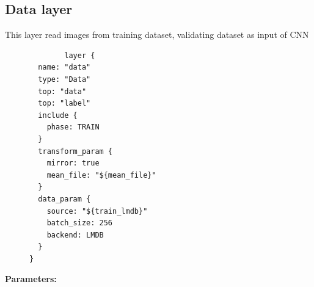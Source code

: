 \documentclass[11pt]{article}
\begin{document}
\subsection{Data layer}
This layer read images from training dataset, validating dataset as input of CNN
\begin{figure}
  \begin{center}
	\begin{verbatim}
		layer {
  name: "data"
  type: "Data"
  top: "data"
  top: "label"
  include {
    phase: TRAIN
  }
  transform_param {
    mirror: true
    mean_file: "${mean_file}"
  }
  data_param {
    source: "${train_lmdb}"
    batch_size: 256
    backend: LMDB
  }
}
	\end{verbatim}
  \end{center}
\end{figure}
\textbf{Parameters:} 
\end{document}
